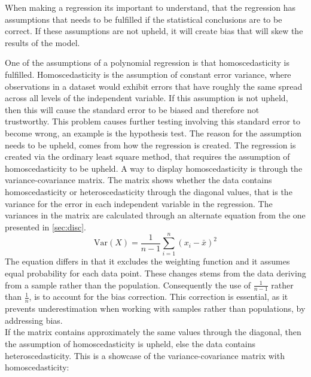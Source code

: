 When making a regression its important to understand, that the regression has assumptions that needs to be fulfilled if the statistical conclusions are to be correct. If these assumptions are not upheld, it will create bias that will skew the results of the model. \newline 

One of the assumptions of a polynomial regression is that homoscedasticity is fulfilled. Homoscedasticity is the assumption of constant error variance, where observations in a dataset would exhibit errors that have roughly the same spread across all levels of the independent variable.
\newline
If this assumption is not upheld, then this will cause the standard error to be biased and therefore not trustworthy. This problem causes further testing involving this standard error to become wrong, an example is the hypothesis test.
\newline
The reason for the assumption needs to be upheld, comes from how the regression is created. The regression is created via the ordinary least square method, that requires the assumption of homoscedasticity to be upheld.
\newline
A way to display homoscedasticity is through the variance-covariance matrix. The matrix shows whether the data contains homoscedasticity or heteroscedasticity through the diagonal values, that is the variance for the error in each independent variable in the regression. The variances in the matrix are calculated through an alternate equation from the one presented in \autoref{sec:disc}.
\begin{equation}
	\text{Var}(X) = \frac{1}{n - 1} \sum_{i=1}^{n} (x_i - \bar{x})^2
\end{equation}
The equation differs in that it excludes the weighting function and it assumes equal probability for each data point. These changes stems from the data deriving from a sample rather than the population. Consequently the use of $\frac{1}{n-1}$ rather than $\frac{1}{n}$, is to account for the bias correction. This correction is essential, as it prevents underestimation when working with samples rather than populations, by addressing bias.\\
If the matrix contains approximately the same values through the diagonal, then the assumption of homoscedasticity is upheld, else the data contains heteroscedasticity. This is a showcase of the variance-covariance matrix with homoscedasticity:


